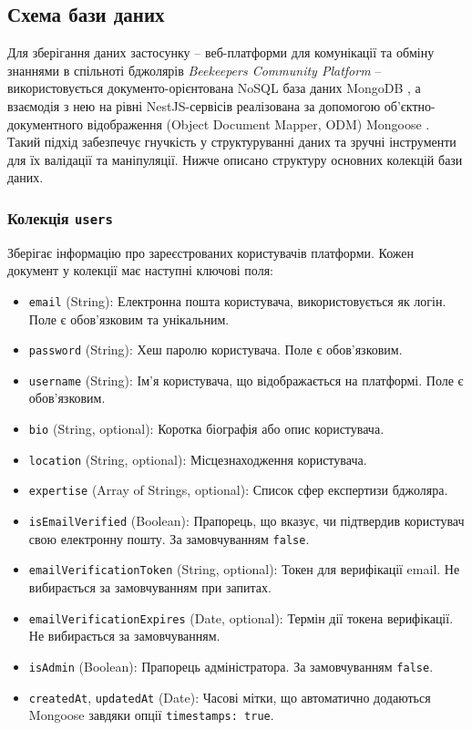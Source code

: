 \subsection{Схема бази даних}
\label{subsec:db_schema_detailed}
Для зберігання даних застосунку – веб-платформи для комунікації та обміну знаннями в спільноті бджолярів \textit{Beekeepers Community Platform} – використовується документо-орієнтована NoSQL база даних MongoDB \cite{mongodb}, а взаємодія з нею на рівні NestJS-сервісів реалізована за допомогою об'єктно-документного відображення (Object Document Mapper, ODM) Mongoose \cite{mongoose}. Такий підхід забезпечує гнучкість у структуруванні даних та зручні інструменти для їх валідації та маніпуляції. Нижче описано структуру основних колекцій бази даних.

\subsubsection*{Колекція \texttt{users}}
Зберігає інформацію про зареєстрованих користувачів платформи. Кожен документ у колекції має наступні ключові поля:
\begin{itemize}
    \item \texttt{email} (String): Електронна пошта користувача, використовується як логін. Поле є обов'язковим та унікальним.
    \item \texttt{password} (String): Хеш паролю користувача. Поле є обов'язковим.
    \item \texttt{username} (String): Ім'я користувача, що відображається на платформі. Поле є обов'язковим.
    \item \texttt{bio} (String, optional): Коротка біографія або опис користувача.
    \item \texttt{location} (String, optional): Місцезнаходження користувача.
    \item \texttt{expertise} (Array of Strings, optional): Список сфер експертизи бджоляра.
    \item \texttt{isEmailVerified} (Boolean): Прапорець, що вказує, чи підтвердив користувач свою електронну пошту. За замовчуванням \texttt{false}.
    \item \texttt{emailVerificationToken} (String, optional): Токен для верифікації email. Не вибирається за замовчуванням при запитах.
    \item \texttt{emailVerificationExpires} (Date, optional): Термін дії токена верифікації. Не вибирається за замовчуванням.
    \item \texttt{isAdmin} (Boolean): Прапорець адміністратора. За замовчуванням \texttt{false}.
    \item \texttt{createdAt}, \texttt{updatedAt} (Date): Часові мітки, що автоматично додаються Mongoose завдяки опції \texttt{{timestamps: true}}.
\end{itemize}

